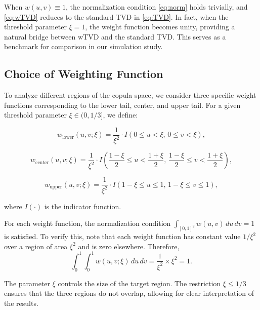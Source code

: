 \documentclass[twoside]{article}
\begin{document}
When \( w(u,v) \equiv 1 \), the normalization condition \eqref{eq:norm} holds trivially, and \eqref{eq:wTVD} reduces to the standard TVD in \eqref{eq:TVD}. In fact, when the threshold parameter $\xi = 1$, the weight function becomes unity, providing a natural bridge between wTVD and the standard TVD. This serves as a benchmark for comparison in our simulation study.

\subsection{Choice of Weighting Function}

To analyze different regions of the copula space, we consider three specific weight functions corresponding to the lower tail, center, and upper tail. For a given threshold parameter $\xi \in (0, 1/3]$, we define:

\begin{equation}
w_{\text{lower}}(u,v;\xi) = \frac{1}{\xi^2} \cdot I(0 \leq u < \xi, \, 0 \leq v < \xi),
\label{eq:lower_weight}
\end{equation}

\begin{equation}
w_{\text{center}}(u,v;\xi) = \frac{1}{\xi^2} \cdot I\left(\frac{1-\xi}{2} \leq u < \frac{1+\xi}{2}, \, \frac{1-\xi}{2} \leq v < \frac{1+\xi}{2}\right),
\label{eq:center_weight}
\end{equation}

\begin{equation}
w_{\text{upper}}(u,v;\xi) = \frac{1}{\xi^2} \cdot I(1-\xi \leq u \leq 1, \, 1-\xi \leq v \leq 1),
\label{eq:upper_weight}
\end{equation}

where \( I(\cdot) \) is the indicator function.

For each weight function, the normalization condition $\int_{[0,1]^2} w(u,v)\,du\,dv = 1$ is satisfied. To verify this, note that each weight function has constant value $1/\xi^2$ over a region of area $\xi^2$ and is zero elsewhere. Therefore,
\[
\int_0^1 \int_0^1 w(u,v;\xi)\,du\,dv = \frac{1}{\xi^2} \times \xi^2 = 1.
\]

The parameter $\xi$ controls the size of the target region. The restriction $\xi \leq 1/3$ ensures that the three regions do not overlap, allowing for clear interpretation of the results.
\end{document}
